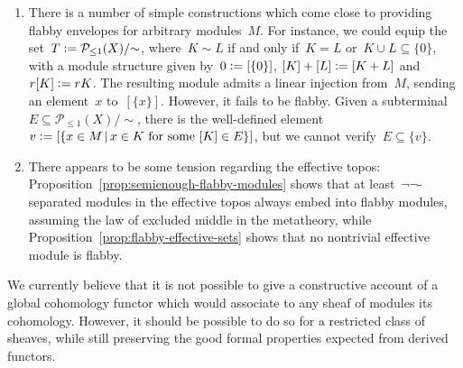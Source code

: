 \documentclass[oneside]{amsart}
\theoremstyle{definition}
\theoremstyle{plain}
\theoremstyle{remark}
\renewcommand{\P}{\mathcal{P}}
\newcommand{\defeq}{\vcentcolon=}
\renewcommand{\_}{\mathpunct{.}\,}
\newcommand{\effective}{ef{}fective\xspace}
\begin{document}
\begin{enumerate}
However, it is an open question under which circumstances quotient inductive
types can be shown to exist. Zermelo--Fraenkel with choice certainly suffices,
while Zermelo--Fraenkel without choice doesn't~\cite[Section~9]{shulman-lumsdaine:hits},
hence IZF also doesn't.\footnote{With quotient inductive types, any infinitary
algebraic theory admits free algebras. However, it is consistent with
Zermelo--Fraenkel set theory that some such theories don't admit free
algebras~\cite{blass:free-algebras}.} The existence of quotient inductive types
seem to be, as the existence of enough injective modules, \emph{constructively
neutral}.

\item There is a number of simple constructions which come close to providing
flabby envelopes for arbitrary modules~$M$. For instance, we could equip the set~$T
\defeq \P_{\leq1}(X)/{\sim}$, where~$K \sim L$ if and only if~$K = L$ or~$K
\cup L \subseteq \{0\}$, with a module structure given by~$0 \defeq [\{0\}]$,
$[K]+[L] \defeq [K+L]$ and~$r [K] \defeq rK$. The resulting module admits a
linear injection from~$M$, sending an element~$x$ to~$[\{x\}]$. However, it
fails to be flabby. Given a subterminal~$E \subseteq \P_{\leq1}(X)/{\sim}$,
there is the well-defined element~$v \defeq [\{x \in M\,|\,\text{$x \in K$ for
some~$[K] \in E$}\}]$, but we cannot verify~$E \subseteq \{v\}$.

\item There appears to be some tension regarding the \effective topos:
Proposition~\ref{prop:semienough-flabby-modules} shows that at
least~$\neg\neg$-separated modules in the \effective topos always embed into
flabby modules, assuming the law of excluded middle in the metatheory, while
Proposition~\ref{prop:flabby-effective-sets} shows that no nontrivial \effective
module is flabby.
\end{enumerate}

We currently believe that it is not possible to give a constructive account of
a global cohomology functor which would associate to any sheaf of modules its
cohomology. However, it should be possible to do so for a restricted class of
sheaves, while still preserving the good formal properties expected from
derived functors.

\printbibliography
\end{document}
